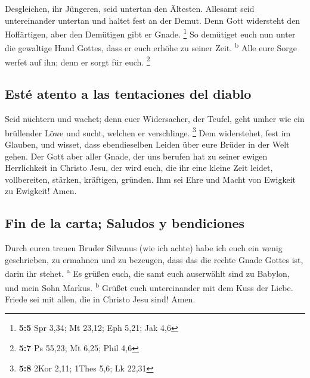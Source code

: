  Desgleichen, ihr Jüngeren, seid untertan den Ältesten.
Allesamt seid untereinander untertan und haltet fest an der Demut. Denn
Gott widersteht den Hoffärtigen, aber den Demütigen gibt er Gnade.
\footnote{\textbf{5:5} Spr 3,34; Mt 23,12; Eph 5,21; Jak 4,6}
 So demütiget euch nun unter die gewaltige Hand Gottes,
dass er euch erhöhe zu seiner Zeit. \textsuperscript{b} 
Alle eure Sorge werfet auf ihn; denn er sorgt für euch. \footnote{\textbf{5:7}
  Ps 55,23; Mt 6,25; Phil 4,6}

\hypertarget{estuxe9-atento-a-las-tentaciones-del-diablo}{%
\subsection{Esté atento a las tentaciones del
diablo}\label{estuxe9-atento-a-las-tentaciones-del-diablo}}

 Seid nüchtern und wachet; denn euer Widersacher, der
Teufel, geht umher wie ein brüllender Löwe und sucht, welchen er
verschlinge. \footnote{\textbf{5:8} 2Kor 2,11; 1Thes 5,6; Lk 22,31}
 Dem widerstehet, fest im Glauben, und wisset, dass
ebendieselben Leiden über eure Brüder in der Welt gehen. 
Der Gott aber aller Gnade, der uns berufen hat zu seiner ewigen
Herrlichkeit in Christo Jesu, der wird euch, die ihr eine kleine Zeit
leidet, vollbereiten, stärken, kräftigen, gründen.  Ihm
sei Ehre und Macht von Ewigkeit zu Ewigkeit! Amen.

\hypertarget{fin-de-la-carta-saludos-y-bendiciones}{%
\subsection{Fin de la carta; Saludos y
bendiciones}\label{fin-de-la-carta-saludos-y-bendiciones}}

 Durch euren treuen Bruder Silvanus (wie ich achte) habe
ich euch ein wenig geschrieben, zu ermahnen und zu bezeugen, dass das
die rechte Gnade Gottes ist, darin ihr stehet. \textsuperscript{a}
 Es grüßen euch, die samt euch auserwählt sind zu
Babylon, und mein Sohn Markus. \textsuperscript{b} 
Grüßet euch untereinander mit dem Kuss der Liebe. Friede sei mit allen,
die in Christo Jesu sind! Amen.
